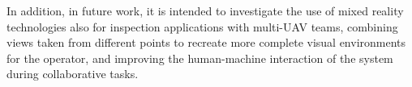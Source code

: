 In addition, in future work, it is intended to investigate the use of mixed reality technologies also for inspection applications with multi-\gls{UAV} teams, combining views taken from different points to recreate more complete visual environments for the operator, and improving the human-machine interaction of the system during collaborative tasks.

\endinput
